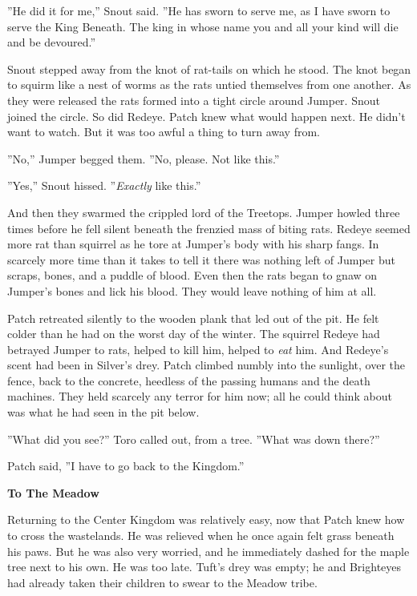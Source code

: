 \documentclass[11pt]{article}
\begin{document}
 ''He did it for me,'' Snout said. ''He has sworn to serve me, as I have sworn to serve the King Beneath. The king in whose name you and all your kind will die and be devoured.''\par
 Snout stepped away from the knot of rat-tails on which he stood. The knot began to squirm like a nest of worms as the rats untied themselves from one another. As they were released the rats formed into a tight circle around Jumper. Snout joined the circle. So did Redeye. Patch knew what would happen next. He didn't want to watch. But it was too awful a thing to turn away from.\par
 ''No,'' Jumper begged them. ''No, please. Not like this.''\par
 ''Yes,'' Snout hissed. ''{\it Exactly} like this.''\par
 And then they swarmed the crippled lord of the Treetops. Jumper howled three times before he fell silent beneath the frenzied mass of biting rats. Redeye seemed more rat than squirrel as he tore at Jumper's body with his sharp fangs. In scarcely more time than it takes to tell it there was nothing left of Jumper but scraps, bones, and a puddle of blood. Even then the rats began to gnaw on Jumper's bones and lick his blood. They would leave nothing of him at all.\par
 Patch retreated silently to the wooden plank that led out of the pit. He felt colder than he had on the worst day of the winter. The squirrel Redeye had betrayed Jumper to rats, helped to kill him, helped to {\it eat} him. And Redeye's scent had been in Silver's drey. Patch climbed numbly into the sunlight, over the fence, back to the concrete, heedless of the passing humans and the death machines. They held scarcely any terror for him now; all he could think about was what he had seen in the pit below.\par
 ''What did you see?'' Toro called out, from a tree. ''What was down there?''\par
 Patch said, ''I have to go back to the Kingdom.''\par
\par
{\bf To The Meadow\par
}\par
 Returning to the Center Kingdom was relatively easy, now that Patch knew how to cross the wastelands. He was relieved when he once again felt grass beneath his paws. But he was also very worried, and he immediately dashed for the maple tree next to his own. He was too late. Tuft's drey was empty; he and Brighteyes had already taken their children to swear to the Meadow tribe.\par
\end{document}
